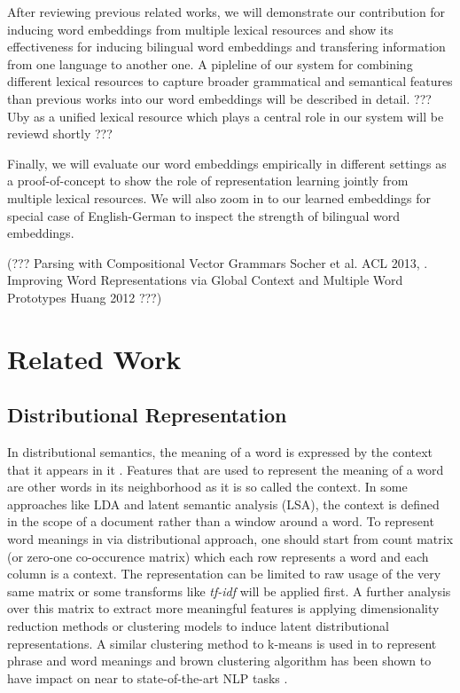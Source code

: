\documentclass[preprint,12pt]{elsarticle}
\begin{document}
 After reviewing previous related works, we will demonstrate our contribution for inducing word embeddings 
 from multiple lexical resources and show its effectiveness for inducing bilingual word embeddings 
 and transfering information from one language to another one.
 A pipleline of our system for combining different lexical resources to capture broader grammatical and semantical
 features than previous works into our word embeddings will be described in detail. ??? Uby as a unified lexical resource which
  plays a central role in our system will be reviewd shortly ???
  
  Finally, we will evaluate our word embeddings empirically in different settings as a proof-of-concept to show
  the role of representation learning jointly from multiple lexical resources. We will also zoom in to our learned
  embeddings for special case of English-German to inspect the strength of bilingual word embeddings.     
 
 (??? Parsing with Compositional Vector Grammars Socher et al. ACL 2013, . Improving Word Representations via Global
Context and Multiple Word Prototypes Huang  2012 ???)

     

\section{Related Work}
\label{sec:rel-work}

\subsection{Distributional Representation}
\label{subsec:distl-repr}
In distributional semantics, the meaning of a word is expressed by the context
that it appears in it \cite{Harris1981}. Features that are used to represent the
meaning of a word are other words in its neighborhood as it is so called the
context. In some approaches like LDA and latent semantic analysis (LSA), 
the context is defined in the scope of a document rather than a window around a
word. To represent word meanings in via distributional approach, one should
start from count matrix (or zero-one co-occurence matrix) which each row
represents a word and each column is a context. The representation can be
limited to raw usage of the very same matrix or some transforms like
\emph{tf-idf} will be applied first. A further analysis over this matrix to
extract more meaningful features is applying dimensionality reduction methods or
clustering models to induce latent distributional representations. A similar
clustering method to k-means is used in \cite{Lin2009} to represent phrase and
word meanings and brown clustering algorithm \cite{Brown1992} has been shown to
have impact on near to state-of-the-art NLP tasks \cite{Turian2010b}. 
\end{document}
